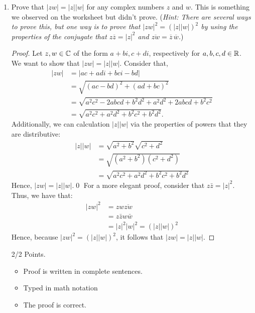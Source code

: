 \begin{enumerate}
	\item Prove that $|zw| = |z| |w|$ for any complex numbers $z$ and $w$. This is something we observed on the worksheet but didn't prove. ({\it Hint: There are several ways to prove this, but one way is to prove that $|zw|^2 = (|z||w|)^2$ by using the properties of the conjugate that $z\overline{z} = |z|^2$ and $\overline{zw} = \overline{z}\, \overline{w}$.})
    \begin{proof}
        Let $z,w\in\mathbb{C}$ of the form $a +bi, c+di$, respectively for $a, b, c, d\in\mathbb{R}$.\gline{}
        We want to show that $|zw|=|z||w|$.\gline{}
        Consider that,
        \begin{align*}
            |zw| &= |ac + adi + bci - bd|\\
            &= \sqrt{(ac-bd)^2 + (ad + bc)^2}\\
            &= \sqrt{a^2c^2 - 2abcd + b^2d^2 + a^2d^2 + 2abcd + b^2c^2}\\
            &= \sqrt{a^2c^2 + a^2d^2 + b^2c^2 + b^2d^2}.
        \end{align*}
        Additionally, we can calculation $|z||w|$ via the properties of powers that they are distributive:
        \begin{align*}
            |z||w|&= \sqrt{a^2+b^2}\sqrt{c^2+d^2}\\
            &= \sqrt{(a^2+b^2)(c^2+d^2)}\\
            &= \sqrt{a^2c^2+a^2d^2+b^2c^2+b^2d^2}
        \end{align*}
        Hence, $|zw|=|z||w|$.\qed\gline{}
        For a more elegant proof, consider that $z\bar z = |z|^2$. Thus, we have that:
        \begin{align*}
            |zw|^2 &= zw\overline{zw}\\
            &= z\bar z w \bar w \\
            &= |z|^2|w|^2 = (|z||w|)^2
        \end{align*}
        Hence, because $|zw|^2 = (|z||w|)^2$, it follows that $|zw| = |z||w|$. 
    \end{proof}
    \begin{grade}
        2/2 Points.
        \begin{itemize}[itemsep=0pt, parsep=0pt]
            \item Proof is written in complete sentences.
            \item Typed in math notation
            \item The proof is correct. 
        \end{itemize}
    \end{grade}
		

\end{enumerate}
